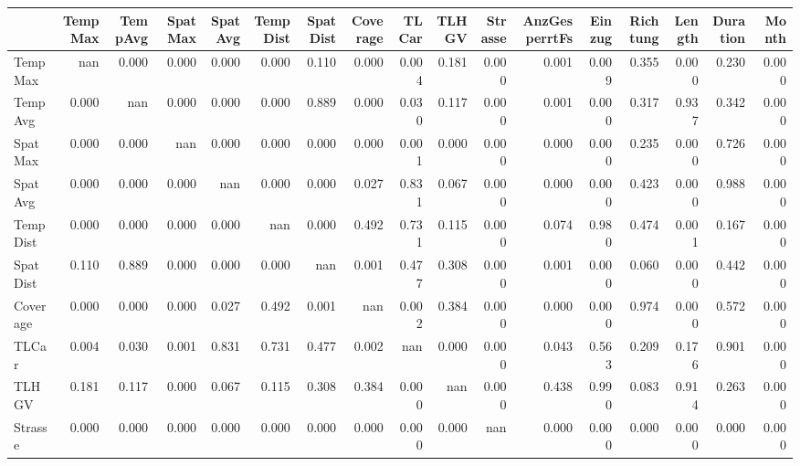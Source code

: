 \begin{tabular}{lrrrrrrrrrrrrrrrr}
\toprule
{} &  TempMax &  TempAvg &  SpatMax &  SpatAvg &  TempDist &  SpatDist &  Coverage &  TLCar &  TLHGV &  Strasse &  AnzGesperrtFs &  Einzug &  Richtung &  Length &  Duration &  Month \\
\midrule
TempMax       &      nan &    0.000 &    0.000 &    0.000 &     0.000 &     0.110 &     0.000 &  0.004 &  0.181 &    0.000 &          0.001 &   0.009 &     0.355 &   0.000 &     0.230 &  0.000 \\
TempAvg       &    0.000 &      nan &    0.000 &    0.000 &     0.000 &     0.889 &     0.000 &  0.030 &  0.117 &    0.000 &          0.001 &   0.000 &     0.317 &   0.937 &     0.342 &  0.000 \\
SpatMax       &    0.000 &    0.000 &      nan &    0.000 &     0.000 &     0.000 &     0.000 &  0.001 &  0.000 &    0.000 &          0.000 &   0.000 &     0.235 &   0.000 &     0.726 &  0.000 \\
SpatAvg       &    0.000 &    0.000 &    0.000 &      nan &     0.000 &     0.000 &     0.027 &  0.831 &  0.067 &    0.000 &          0.000 &   0.000 &     0.423 &   0.000 &     0.988 &  0.000 \\
TempDist      &    0.000 &    0.000 &    0.000 &    0.000 &       nan &     0.000 &     0.492 &  0.731 &  0.115 &    0.000 &          0.074 &   0.980 &     0.474 &   0.001 &     0.167 &  0.000 \\
SpatDist      &    0.110 &    0.889 &    0.000 &    0.000 &     0.000 &       nan &     0.001 &  0.477 &  0.308 &    0.000 &          0.001 &   0.000 &     0.060 &   0.000 &     0.442 &  0.000 \\
Coverage      &    0.000 &    0.000 &    0.000 &    0.027 &     0.492 &     0.001 &       nan &  0.002 &  0.384 &    0.000 &          0.000 &   0.000 &     0.974 &   0.000 &     0.572 &  0.000 \\
TLCar         &    0.004 &    0.030 &    0.001 &    0.831 &     0.731 &     0.477 &     0.002 &    nan &  0.000 &    0.000 &          0.043 &   0.563 &     0.209 &   0.176 &     0.901 &  0.000 \\
TLHGV         &    0.181 &    0.117 &    0.000 &    0.067 &     0.115 &     0.308 &     0.384 &  0.000 &    nan &    0.000 &          0.438 &   0.990 &     0.083 &   0.914 &     0.263 &  0.000 \\
Strasse       &    0.000 &    0.000 &    0.000 &    0.000 &     0.000 &     0.000 &     0.000 &  0.000 &  0.000 &      nan &          0.000 &   0.000 &     0.000 &   0.000 &     0.000 &  0.000 \\

\end{tabular}
